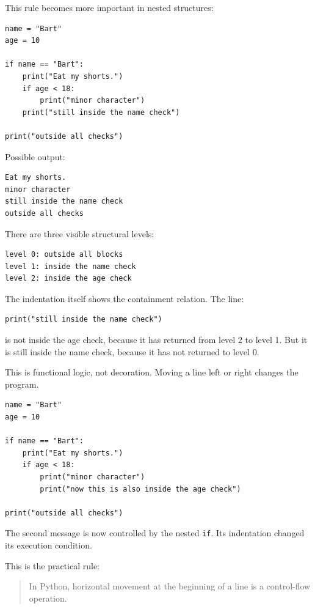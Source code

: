\documentclass[a4paper,twoside]{report}
\begin{document}
This rule becomes more important in nested structures:

\begin{verbatim}
name = "Bart"
age = 10

if name == "Bart":
    print("Eat my shorts.")
    if age < 18:
        print("minor character")
    print("still inside the name check")

print("outside all checks")
\end{verbatim}

Possible output:

\begin{verbatim}
Eat my shorts.
minor character
still inside the name check
outside all checks
\end{verbatim}

There are three visible structural levels:

\begin{verbatim}
level 0: outside all blocks
level 1: inside the name check
level 2: inside the age check
\end{verbatim}

The indentation itself shows the containment relation. The line:

\begin{verbatim}
print("still inside the name check")
\end{verbatim}

is not inside the age check, because it has returned from level 2 to level 1. But it is still inside the name check, because it has not returned to level 0.

This is functional logic, not decoration. Moving a line left or right changes the program.

\begin{verbatim}
name = "Bart"
age = 10

if name == "Bart":
    print("Eat my shorts.")
    if age < 18:
        print("minor character")
        print("now this is also inside the age check")

print("outside all checks")
\end{verbatim}

The second message is now controlled by the nested \texttt{if}. Its indentation changed its execution condition.

This is the practical rule:

\begin{quote}
In Python, horizontal movement at the beginning of a line is a control-flow operation.
\end{quote}
\end{document}
